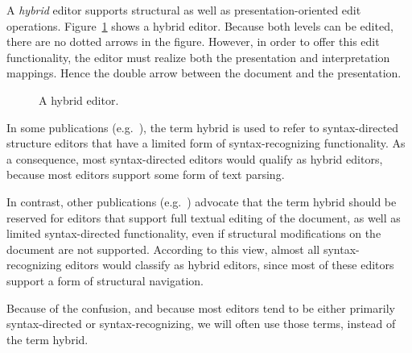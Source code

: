 \documentclass{speauth}
\begin{document}

A {\em hybrid} editor supports structural as well as presentation-oriented edit operations. Figure~\ref{hybridEditor} shows a hybrid editor. Because both levels can be edited, there are no dotted arrows in the figure. However, in order to offer this edit functionality, the editor must realize both the presentation and interpretation mappings. Hence the double arrow between the document and the presentation. 

\begin{figure}

\begin{small}

\begin{center}

\begin{center}


\end{center}\caption{A hybrid editor.}\label{hybridEditor} 

\end{center}

\end{small}

\end{figure}
In some publications (e.g.~\cite{teitelbaum81progSynth, minor90editing}), the term hybrid is used to refer to syntax-directed structure editors that have a limited form of syntax-recognizing functionality. As a consequence, most syntax-directed editors would qualify as hybrid editors, because most editors support some form of text parsing.

In contrast, other publications (e.g.~\cite{ballance92pan, koorn92gse}) advocate that the term hybrid should be reserved for editors that support full textual editing of the document, as well as limited syntax-directed functionality, even if structural modifications on the document are not supported. According to this view, almost all syntax-recognizing editors would classify as hybrid editors, since most of these editors support a form of structural navigation.

Because of the confusion, and because most editors tend to be either primarily syntax-directed or syntax-recognizing, we will often use those terms, instead of the term hybrid.
\end{document}
